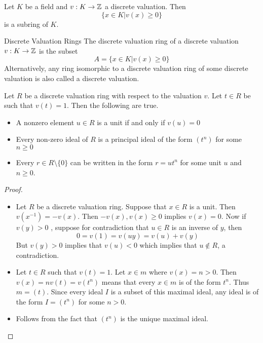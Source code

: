 \documentclass[a4paper]{article}
\begin{document}
\begin{prp}{}{} Let $K$ be a field and $v:K\to\mathbb{Z}$ a discrete valuation. Then $$\{x\in K|v(x)\geq 0\}$$ is a subring of $K$. 
\end{prp}

\begin{defn}{Discrete Valuation Rings}{} The discrete valuation ring of a discrete valuation $v:K\to\mathbb{Z}$ is the subset $$A=\{x\in K|v(x)\geq 0\}$$
Alternatively, any ring isomorphic to a discrete valuation ring of some discrete valuation is also called a discrete valuation. 
\end{defn}

\begin{prp}{}{} Let $R$ be a discrete valuation ring with respect to the valuation $v$. Let $t\in R$ be such that $v(t)=1$. Then the following are true. 
\begin{itemize}
\item A nonzero element $u\in R$ is a unit if and only if $v(u)=0$
\item Every non-zero ideal of $R$ is a principal ideal of the form $(t^n)$ for some $n\geq 0$
\item Every $r\in R\setminus\{0\}$ can be written in the form $r=ut^n$ for some unit $u$ and $n\geq 0$. 
\end{itemize}\tcbline
\begin{proof}~\\
\begin{itemize}
\item Let $R$ be a discrete valuation ring. Suppose that $x\in R$ is a unit. Then $v(x^{-1})=-v(x)$. Then $-v(x),v(x)\geq 0$ implies $v(x)=0$. Now if $v(y)>0$ , suppose for contradiction that $u\in R$ is an inverse of $y$, then $$0=v(1)=v(uy)=v(u)+v(y)$$ But $v(y)>0$ implies that $v(u)<0$ which implies that $u\notin R$, a contradiction. 
\item Let $t\in R$ such that $v(t)=1$. Let $x\in m$ where $v(x)=n>0$. Then $v(x)=nv(t)=v(t^n)$ means that every $x\in m$ is of the form $t^n$. Thus $m=(t)$. Since every ideal $I$ is a subset of this maximal ideal, any ideal is of the form $I=(t^n)$ for some $n>0$. 
\item Follows from the fact that $(t^n)$ is the unique maximal ideal. 
\end{itemize}
\end{proof}
\end{prp}
\end{document}

